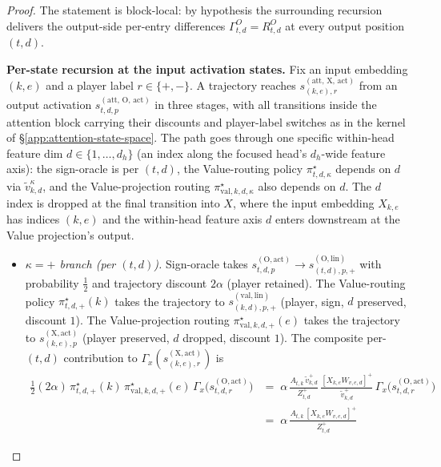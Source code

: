 \documentclass[twoside]{article}
\newcommand{\1}{\mathbf{1}}
\begin{document}
\begin{proof}
The statement is block-local: by hypothesis the surrounding recursion delivers the output-side
per-entry differences $\Gamma^{O}_{t,d} = R^{O}_{t,d}$ at every output position $(t,d)$.

\textbf{Per-state recursion at the input activation states.} Fix an input embedding $(k,e)$ and a
player label $r \in \{+,-\}$. A trajectory reaches
$s_{(k,e),r}^{(\mathrm{att},\,\mathrm{X},\,\mathrm{act})}$ from an output activation
$s_{t,d,p}^{(\mathrm{att},\,\mathrm{O},\,\mathrm{act})}$ in three stages, with all transitions
inside the attention block carrying their discounts and player-label switches as in the kernel of
\S\ref{app:attention-state-space}. The path goes through one specific within-head feature dim $d
    \in \{1,\dots,d_h\}$ (an index along the focused head's $d_h$-wide feature axis): the sign-oracle
is per $(t,d)$, the Value-routing policy $\pi_{t,d,\kappa}^\star$ depends on $d$ via
$\tilde{v}_{k,d}^\kappa$, and the Value-projection routing $\pi_{\mathrm{val},k,d,\kappa}^\star$
also depends on $d$. The $d$ index is dropped at the final transition into $X$, where the input
embedding $X_{k,e}$ has indices $(k,e)$ and the within-head feature axis $d$ enters downstream at
the Value projection's output.
\begin{itemize}
    \item \emph{$\kappa = +$ branch (per $(t,d)$).} Sign-oracle takes $s_{t,d,p}^{(\mathrm{O},\mathrm{act})}
            \to s_{(t,d),p,+}^{(\mathrm{O},\mathrm{lin})}$ with probability $\tfrac12$ and trajectory discount
        $2\alpha$ (player retained). The Value-routing policy $\pi_{t,d,+}^\star(k)$ takes the trajectory
        to $s_{(k,d),p,+}^{(\mathrm{val},\mathrm{lin})}$ (player, sign, $d$ preserved, discount $1$). The
        Value-projection routing $\pi_{\mathrm{val},k,d,+}^\star(e)$ takes the trajectory to
        $s_{(k,e),p}^{(\mathrm{X},\mathrm{act})}$ (player preserved, $d$ dropped, discount $1$). The
        composite per-$(t,d)$ contribution to $\Gamma_x(s_{(k,e),r}^{(\mathrm{X},\mathrm{act})})$ is
        \begin{align}
            \tfrac12 (2\alpha)\, \pi_{t,d,+}^\star(k)\, \pi_{\mathrm{val},k,d,+}^\star(e)\,
            \Gamma_x\!\bigl(s_{t,d,r}^{(\mathrm{O},\mathrm{act})}\bigr)
            &=\; \alpha\, \frac{A_{t,k}\, \tilde{v}_{k,d}^+}{Z_{t,d}^+}\,\frac{[X_{k,e}
            W_{v,e,d}]^+}{\tilde{v}_{k,d}^+}\, \Gamma_x\!\bigl(s_{t,d,r}^{(\mathrm{O},\mathrm{act})}\bigr) \\
            &=\; \alpha\, \frac{A_{t,k}\, [X_{k,e} W_{v,e,d}]^+}{Z_{t,d}^+}\,

\end{align}
\end{itemize}
\end{proof}
\end{document}
